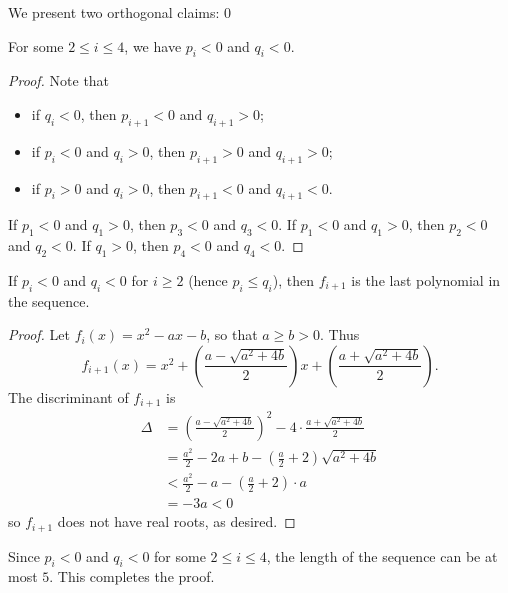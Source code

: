We present two orthogonal claims:
\setcounter{claim}0
\begin{claim}
    For some $2\le i\le4$, we have $p_i<0$ and $q_i<0$.
\end{claim}
\begin{proof}
    Note that
    \begin{itemize}[itemsep=0em]
        \item if $q_i<0$, then $p_{i+1}<0$ and $q_{i+1}>0$;
        \item if $p_i<0$ and $q_i>0$, then $p_{i+1}>0$ and $q_{i+1}>0$;
        \item if $p_i>0$ and $q_i>0$, then $p_{i+1}<0$ and $q_{i+1}<0$.
    \end{itemize}
    If $p_1<0$ and $q_1>0$, then $p_3<0$ and $q_3<0$. If $p_1<0$ and $q_1>0$, then $p_2<0$ and $q_2<0$. If $q_1>0$, then $p_4<0$ and $q_4<0$.
\end{proof}
\begin{claim}
    If $p_i<0$ and $q_i<0$ for $i\ge2$ (hence $p_i\le q_i$), then $f_{i+1}$ is the last polynomial in the sequence.
\end{claim}
\begin{proof}
    Let $f_i(x)=x^2-ax-b$, so that $a\ge b>0$. Thus \[f_{i+1}(x)=x^2+\left(\frac{a-\sqrt{a^2+4b}}2\right)x+\left(\frac{a+\sqrt{a^2+4b}}2\right).\]
    The discriminant of $f_{i+1}$ is
    \begin{align*}
        \Delta&=\left(\frac{a-\sqrt{a^2+4b}}2\right)^2-4\cdot\frac{a+\sqrt{a^2+4b}}2\\
        &=\frac{a^2}2-2a+b-\left(\frac a2+2\right)\sqrt{a^2+4b}\\
        &<\frac{a^2}2-a-\left(\frac a2+2\right)\cdot a\\
        &=-3a<0
    \end{align*}
    so $f_{i+1}$ does not have real roots, as desired.
\end{proof}

Since $p_i<0$ and $q_i<0$ for some $2\le i\le 4$, the length of the sequence can be at most $5$. This completes the proof.

